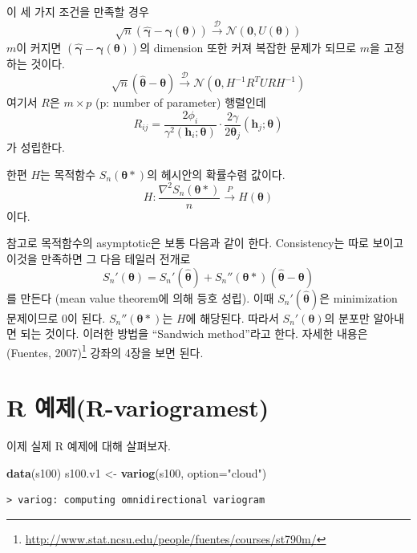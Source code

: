 \documentclass[b5paper,]{scrbook}
\makeatletter
\newenvironment{Shaded}{\begin{snugshade}}{\end{snugshade}}
\newcommand{\KeywordTok}[1]{\textcolor[rgb]{0.13,0.29,0.53}{\textbf{#1}}}
\newcommand{\DataTypeTok}[1]{\textcolor[rgb]{0.13,0.29,0.53}{#1}}
\newcommand{\StringTok}[1]{\textcolor[rgb]{0.31,0.60,0.02}{#1}}
\newcommand{\NormalTok}[1]{#1}
\theoremstyle{plain}
\theoremstyle{definition}
\numberwithin{equation}{section}
\renewcommand{\href}[2]{#2\footnote{\url{#1}}}
\newenvironment{kframe}{%
\medskip{}
\setlength{\fboxsep}{.8em}
 \def\at@end@of@kframe{}%
 \ifinner\ifhmode%
  \def\at@end@of@kframe{\end{minipage}}%
  \begin{minipage}{\columnwidth}%
 \fi\fi%
 \def\FrameCommand##1{\hskip\@totalleftmargin \hskip-\fboxsep
 \colorbox{shadecolor}{##1}\hskip-\fboxsep
     \hskip-\linewidth \hskip-\@totalleftmargin \hskip\columnwidth}%
 \MakeFramed {\advance\hsize-\width
   \@totalleftmargin\z@ \linewidth\hsize
   \@setminipage}}%
 {\par\unskip\endMakeFramed%
 \at@end@of@kframe}
\renewenvironment{Shaded}{\begin{kframe}}{\end{kframe}}
\makeatother
\begin{document}
이 세 가지 조건을 만족할 경우
\[\sqrt{n}(\hat{\boldsymbol{\gamma}}-\boldsymbol{\gamma}(\boldsymbol{\theta}))  \stackrel{\mathcal{D}}{\rightarrow} \mathcal{N}(\mathbf{0}, U(\boldsymbol{\theta}))\]
\(m\)이 커지면
\((\hat{\boldsymbol{\gamma}}-\boldsymbol{\gamma}(\boldsymbol{\theta}))\)의
dimension 또한 커져 복잡한 문제가 되므로 \(m\)을 고정하는 것이다.
\[\sqrt{n}(\hat{\boldsymbol{\theta}}-\boldsymbol{\theta})  \stackrel{\mathcal{D}}{\rightarrow} \mathcal{N}(\mathbf{0}, H^{-1}R^{T}URH^{-1})\]
여기서 \(R\)은 \(m \times p\) (p: number of parameter) 행렬인데
\[R_{ij}=\frac{2\phi_{i}}{\gamma^{2}(\mathbf{h}_{i};\boldsymbol{\theta})}\cdot \frac{2\gamma}{2\boldsymbol{\theta}_{j}}(\mathbf{h}_{j};\boldsymbol{\theta})\]
가 성립한다.

한편 \(H\)는 목적함수 \(S_{n}(\boldsymbol{\theta}*)\)의 헤시안의
확률수렴 값이다.
\[H:\frac{\nabla^{2}S_{n}(\boldsymbol{\theta}*)}{n} \stackrel{P}{\rightarrow} H(\boldsymbol{\theta})\]
이다.

참고로 목적함수의 asymptotic은 보통 다음과 같이 한다. Consistency는 따로
보이고 이것을 만족하면 그 다음 테일러 전개로
\[S_{n}'(\boldsymbol{\theta})=S_{n}'(\hat{\boldsymbol{\theta}})+S_{n}''(\boldsymbol{\theta}*)(\hat{\boldsymbol{\theta}}-\boldsymbol{\theta})\]
를 만든다 (mean value theorem에 의해 등호 성립). 이때
\(S_{n}'(\hat{\boldsymbol{\theta}})\)은 minimization 문제이므로 0이
된다. \(S_{n}''(\boldsymbol{\theta}*)\)는 \(H\)에 해당된다. 따라서
\(S_{n}'(\boldsymbol{\theta})\)의 분포만 알아내면 되는 것이다. 이러한
방법을 ``Sandwich method''라고 한다. 자세한 내용은
\href{http://www.stat.ncsu.edu/people/fuentes/courses/st790m/}{(Fuentes,
2007)} 강좌의 4장을 보면 된다.

\section{R 예제(R-variogramest)}\label{r-r-variogramest}

이제 실제 R 예제에 대해 살펴보자.

\begin{Shaded}
\begin{Highlighting}[]
\KeywordTok{data}\NormalTok{(s100)}
\NormalTok{s100.v1 <-}\StringTok{ }\KeywordTok{variog}\NormalTok{(s100, }\DataTypeTok{option=}\StringTok{"cloud"}\NormalTok{)}
\end{Highlighting}
\end{Shaded}

\begin{verbatim}
> variog: computing omnidirectional variogram
\end{verbatim}
\end{document}
